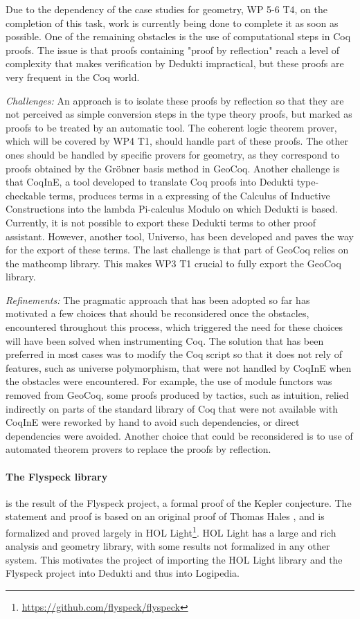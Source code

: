 Due to the dependency of the case studies for geometry, WP 5-6 T4, on
the completion of this task, work is currently being done to complete
it as soon as possible. One of the remaining obstacles is the use of
computational steps in Coq proofs. The issue is that proofs containing
"proof by reflection" reach a level of complexity that makes
verification by Dedukti impractical, but these proofs are very
frequent in the Coq world.

\emph{Challenges:}
An approach is to isolate these proofs by reflection so that they are not perceived as simple conversion steps in the type theory proofs, but marked as proofs to be treated by an automatic tool. The coherent logic theorem prover, which will be covered by WP4 T1, should handle part of these proofs. The other ones should be handled by specific provers for geometry, as they correspond to proofs obtained by the Gr\"obner basis method in GeoCoq.
Another challenge is that CoqInE, a tool developed to translate Coq proofs into Dedukti type-checkable terms, produces terms in a expressing of the Calculus of Inductive Constructions into the lambda Pi-calculus Modulo on which Dedukti is based. Currently, it is not possible to export these Dedukti terms to other proof assistant. However, another tool, Universo, has been developed and paves the way for the export of these terms.
The last challenge is that part of GeoCoq relies on the mathcomp library. This makes WP3 T1 crucial to fully export the GeoCoq library.

\emph{Refinements:}
The pragmatic approach that has been adopted so far has motivated a
few choices that should be reconsidered once the obstacles,
encountered throughout this process, which triggered the need for
these choices will have been solved when instrumenting Coq. The solution that
has been preferred in most cases was to modify the Coq script so that
it does not rely of features, such as universe polymorphism, that were
not handled by CoqInE when the obstacles were encountered. For
example, the use of module functors was removed from GeoCoq, some
proofs produced by tactics, such as intuition, relied indirectly on
parts of the standard library of Coq that were not available with
CoqInE were reworked by hand to avoid such dependencies, or direct
dependencies were avoided. Another choice that could be reconsidered
is to use of automated theorem provers to replace the proofs by reflection.

\paragraph*{The Flyspeck library} is the result of the Flyspeck
project, a formal proof of the Kepler conjecture. The statement and
proof is based on an original proof of Thomas Hales
\cite{DBLP:journals/corr/HalesABDHHKMMNNNOPRSTTTUVZ15}, and is
formalized and proved largely in HOL
Light\footnote{\url{https://github.com/flyspeck/flyspeck}}. HOL Light
has a large and rich analysis and geometry library, with some results
not formalized in any other system. This motivates the project of
importing the HOL Light library and the Flyspeck project into
Dedukti and thus into Logipedia.

